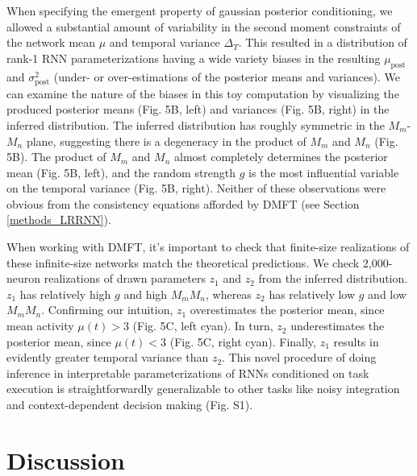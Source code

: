 \documentclass[11pt]{article}
\begin{document}
When specifying the emergent property of gaussian posterior conditioning, we allowed a substantial amount of variability in the second moment constraints of the network mean $\mu$ and temporal variance $\Delta_T$. This resulted in a distribution of rank-1 RNN parameterizations having a wide variety biases in the resulting $\mu_{\text{post}}$ and $\sigma^2_{\text{post}}$ (under- or over-estimations of the posterior means and variances).  We can examine the nature of the biases in this toy computation by visualizing the produced posterior means (Fig. 5B, left) and variances (Fig. 5B, right) in the inferred distribution.  The inferred distribution has roughly symmetric in the $M_m$-$M_n$ plane, suggesting there is a degeneracy in the product of $M_m$ and $M_n$ (Fig. 5B).  
The product of $M_m$ and $M_n$ almost completely determines the posterior mean (Fig. 5B, left), and the random strength $g$ is the most influential variable on the temporal variance (Fig. 5B, right).
Neither of these observations were obvious from the consistency equations afforded by DMFT (see Section \ref{methods_LRRNN}).
 
When working with DMFT, it's important to check that finite-size realizations of these infinite-size networks match the theoretical predictions. We check 2,000-neuron realizations of drawn parameters $z_1$ and $z_2$ from the inferred distribution.  $z_1$ has relatively high $g$ and high $M_m M_n$, whereas $z_2$ has relatively low $g$ and low $M_m M_n$.  Confirming our intuition, $z_1$ overestimates the posterior mean, since mean activity $\mu(t) > 3$  (Fig. 5C, left cyan).  In turn, $z_2$ underestimates the posterior mean, since $\mu(t) < 3$ (Fig. 5C, right cyan).  Finally, $z_1$ results in evidently greater temporal variance than $z_2$. This novel procedure of doing inference in interpretable parameterizations of RNNs conditioned on task execution is straightforwardly generalizable to other tasks like noisy integration and context-dependent decision making (Fig. S1).

\section{Discussion}
\end{document}
